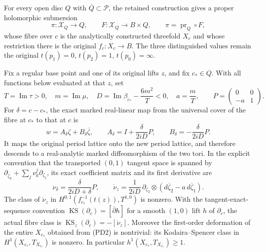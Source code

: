 \begin{theorem}
\label{thm:retained-period-deformation}
For every open disc $Q$ with $\overline Q\subset\mathcal P$, the retained
construction gives a proper holomorphic submersion
\[
 \pi:\mathcal X_Q\longrightarrow Q,
 \qquad F:\mathcal X_Q\longrightarrow B\times Q,
 \qquad \pi=\operatorname{pr}_Q\circ F,
 \tag{PD2}
\]
whose fibre over $c$ is the analytically constructed threefold $X_c$ and
whose restriction there is the original $f_c:X_c\to B$.
The three distinguished values remain the original
$t(p_1)=0$, $t(p_2)=1$, $t(p_0)=\infty$.

Fix a regular base point and one of its original lifts $z$, and fix
$c_*\in Q$. With all functions below evaluated at that $z$, set
\[
 T=\operatorname{Im}\tau>0,\quad m=\operatorname{Im}\mu,\quad
 D=\operatorname{Im}\beta_{c_*}-\frac{6m^2}{T}<0,\quad a=\frac mT,
 \qquad P=\begin{pmatrix}0&0\\-a&1\end{pmatrix}.
 \tag{PD3}
\]
For $\delta=c-c_*$, the exact marked real-linear map from the universal
cover of the fibre at $c_*$ to that at $c$ is
\[
 w=A_\delta\zeta+B_\delta\overline\zeta,\qquad
 A_\delta=I+\frac{\delta}{2iD}P,\qquad
 B_\delta=-\frac{\delta}{2iD}P.
 \tag{PD4}
\]
It maps the original period lattice onto the new period lattice, and
therefore descends to a real-analytic marked diffeomorphism of the two
tori. In the explicit convention that the transported $(0,1)$ tangent
space is spanned by
$\partial_{\overline\zeta_k}+\sum_j\nu^j_k\partial_{\zeta_j}$,
its exact coefficient matrix and its first derivative are
\[
 \nu_\delta=\frac{\delta}{2iD+\delta}P,\qquad
 \dot\nu_z=\frac{1}{2iD}\,
 \partial_{\zeta_2}\otimes
 (d\overline\zeta_2-a\,d\overline\zeta_1).
 \tag{PD5}
\]
The class of $\dot\nu_z$ in
$H^{0,1}(f_{c_*}^{-1}(t(z)),T^{1,0})$ is nonzero.
With the tangent-exact-sequence convention
$\operatorname{KS}(\partial_c)=[\bar\partial h]$ for a smooth
$(1,0)$ lift $h$ of $\partial_c$, the actual fibre class is
$\operatorname{KS}_z(\partial_c)=-[\dot\nu_z]$.
Moreover the first-order deformation of the entire $X_{c_*}$ obtained
from (PD2) is nontrivial: its Kodaira--Spencer class in
$H^1(X_{c_*},T_{X_{c_*}})$ is nonzero. In particular
$h^1(X_{c_*},T_{X_{c_*}})\geq1$.
\end{theorem}

